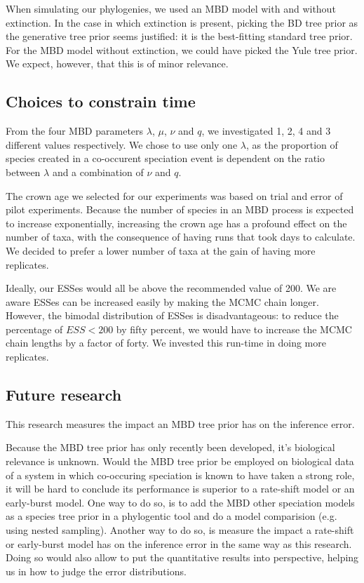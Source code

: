 When simulating our phylogenies, we used an MBD model with and without
extinction. In the case in which extinction is present,
picking the BD tree prior as the generative tree prior seems justified:
it is the best-fitting standard tree prior. For the MBD model without
extinction, we could have picked the Yule tree prior. We expect, however,
that this is of minor relevance.

\subsection{Choices to constrain time}

From the four MBD parameters $\lambda$, $\mu$, $\nu$ and $q$,
we investigated 1, 2, 4 and 3 different values respectively.
We chose to use only one $\lambda$, as the proportion of species
created in a co-occurent speciation event is dependent on the ratio
between $\lambda$ and a combination of $\nu$ and $q$.  

The crown age we selected for our experiments was based on trial and error
of pilot experiments. Because the number of species in an MBD process is
expected to increase exponentially, increasing the crown age has a
profound effect on the number of taxa, with the consequence of having
runs that took days to calculate. We decided to prefer a lower number of
taxa at the gain of having more replicates.

Ideally, our ESSes would all be above the recommended value of 
200. We are aware ESSes can be increased easily by
making the MCMC chain longer. However, the bimodal
distribution of ESSes is disadvantageous: to reduce the percentage 
of $ESS < 200$ by fifty percent,
we would have to increase the MCMC chain lengths by a factor of forty.
We invested this run-time in doing more replicates.

\subsection{Future research}

This research measures the impact an MBD tree prior 
has on the inference error.

Because the MBD tree prior has only recently been 
developed, it's biological relevance is unknown.
Would the MBD tree prior be employed on biological data of a system
in which co-occuring speciation is known to have taken a strong role,
it will be hard to conclude its performance is superior to a
rate-shift model or an early-burst model. One way to do so, is
to add the MBD other speciation models as a species tree prior
in a phylogentic tool and do a model comparision (e.g. using nested sampling).
Another way to do so, is measure the impact a rate-shift or early-burst model
has on the inference error in the same way as this research.
Doing so would also allow to put the quantitative results into perspective,
helping us in how to judge the error distributions. 


